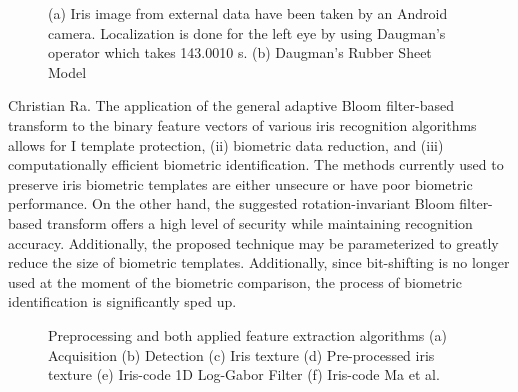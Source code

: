 \documentclass[9pt,twocolumn,twoside]{osajnl}
\begin{document}
\begin{figure}[htbp]
\centering
{}
\caption{(a) Iris image from external data have been taken by an Android camera. Localization is done for the left eye by using Daugman's operator which takes 143.0010 s. (b) Daugman's Rubber Sheet Model}
\label{fig:Android}
\end{figure}

Christian Ra. \cite{sam:6} The application of the general adaptive Bloom filter-based transform to the binary feature vectors of various iris recognition algorithms allows for I template protection, (ii) biometric data reduction, and (iii) computationally efficient biometric identification. The methods currently used to preserve iris biometric templates are either unsecure or have poor biometric performance. On the other hand, the suggested rotation-invariant Bloom filter-based transform offers a high level of security while maintaining recognition accuracy. Additionally, the proposed technique may be parameterized to greatly reduce the size of biometric templates. Additionally, since bit-shifting is no longer used at the moment of the biometric comparison, the process of biometric identification is significantly sped up.

\begin{figure}[htbp]
\centering
{}
\caption{Preprocessing and both applied feature extraction algorithms
(a) Acquisition
(b) Detection
(c) Iris texture
(d) Pre-processed iris texture
(e) Iris-code 1D Log-Gabor Filter
(f) Iris-code Ma et al.}
\label{fig:Gabor}
\end{figure}
\end{document}
